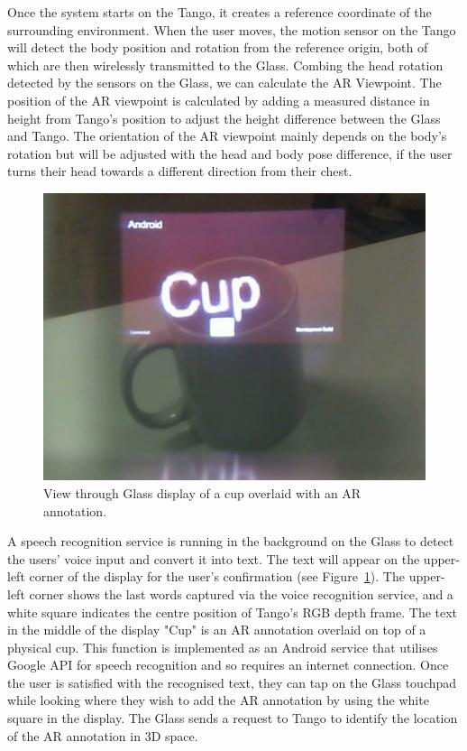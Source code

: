 Once the system starts on the Tango, it creates a reference coordinate of the surrounding environment. When the user moves, the motion sensor on the Tango will detect the body position and rotation from the reference origin, both of which are then wirelessly transmitted to the Glass. Combing the head rotation detected by the sensors on the Glass, we can calculate the AR Viewpoint. The position of the AR viewpoint is calculated by adding a measured distance in height from Tango's position to adjust the height difference between the Glass and Tango. The orientation of the AR viewpoint mainly depends on the body's rotation but will be adjusted with the head and body pose difference, if the user turns their head towards a different direction from their chest. 

\begin{figure}[ht]
  \centering
  \includegraphics[width=.8\linewidth]{images/mgia15/WIN_20150614_204531_2.jpg}
  \caption{View through Glass display of a cup overlaid with an AR annotation.}
  \label{fig:mgia15:ui}
\end{figure}

A speech recognition service is running in the background on the Glass to detect the users' voice input and convert it into text. The text will appear on the upper-left corner of the display for the user's confirmation (see Figure~\ref{fig:mgia15:ui}). The upper-left corner shows the last words captured via the voice recognition service, and a white square indicates the centre position of Tango's RGB depth frame. The text in the middle of the display "Cup" is an AR annotation overlaid on top of a physical cup. This function is implemented as an Android service that utilises Google API for speech recognition and so requires an internet connection. Once the user is satisfied with the recognised text, they can tap on the Glass touchpad while looking where they wish to add the AR annotation by using the white square in the display. The Glass sends a request to Tango to identify the location of the AR annotation in 3D space.

